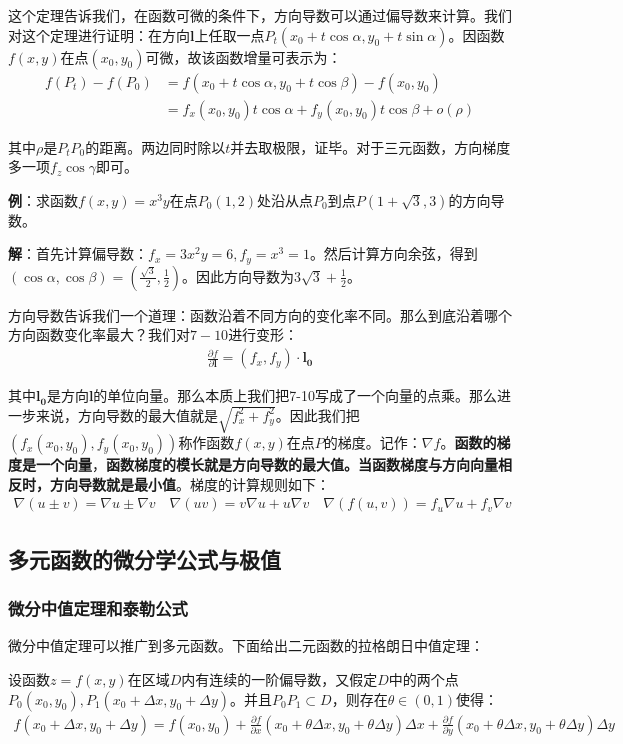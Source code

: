 \documentclass{ctexart}
\let\oldtextbf\textbf %
\renewcommand{\textbf}[1]{\textcolor{btex}{\oldtextbf{#1}}} %
\begin{document}
这个定理告诉我们，在函数可微的条件下，方向导数可以通过偏导数来计算。我们对这个定理进行证明：在方向$\bm{l}$上任取一点$P_t(x_0+t\cos\alpha,y_0+t\sin\alpha)$。因函数$f(x,y)$在点$(x_0,y_0)$可微，故该函数增量可表示为：
\begin{align*}
    f(P_t)-f(P_0)&=f(x_0+t\cos\alpha,y_0+t\cos\beta)-f(x_0,y_0)\\
    &=f_x(x_0,y_0)t\cos\alpha+f_y(x_0,y_0)t\cos\beta+o(\rho)
\end{align*}

其中$\rho$是$P_tP_0$的距离。两边同时除以$t$并去取极限，证毕。对于三元函数，方向梯度多一项$f_z\cos\gamma$即可。

\textbf{例}：求函数$f(x,y)=x^3y$在点$P_0(1,2)$处沿从点$P_0$到点$P(1+\sqrt{3},3)$的方向导数。

\textbf{解}：首先计算偏导数：$f_x=3x^2y=6,f_y=x^3=1$。然后计算方向余弦，得到$(\cos\alpha,\cos\beta)=(\frac{\sqrt{3}}{2},\frac{1}{2})$。因此方向导数为$3\sqrt{3}+\frac{1}{2}$。

方向导数告诉我们一个道理：函数沿着不同方向的变化率不同。那么到底沿着哪个方向函数变化率最大？我们对$7-10$进行变形：
\begin{align*}
    \frac{\partial f}{\partial \bm{l}}=(f_x,f_y)\cdot \bm{l_0}
\end{align*}

其中$\bm{l_0}$是方向$\bm{l}$的单位向量。那么本质上我们把7-10写成了一个向量的点乘。那么进一步来说，方向导数的最大值就是$\sqrt{f_x^2+f_y^2}$。因此我们把$(f_x(x_0,y_0),f_y(x_0,y_0))$称作函数$f(x,y)$在点$P$的梯度。记作：$\nabla f$。\textbf{函数的梯度是一个向量}，\textbf{函数梯度的模长就是方向导数的最大值。当函数梯度与方向向量相反时，方向导数就是最小值}。梯度的计算规则如下：
\begin{align*}
    \nabla(u\pm v)=\nabla u\pm \nabla v \quad \nabla(uv)=v\nabla u+u\nabla v\quad \nabla(f(u,v))=f_u\nabla u+f_v\nabla v
\end{align*}

\subsection{多元函数的微分学公式与极值}
\subsubsection{微分中值定理和泰勒公式}
微分中值定理可以推广到多元函数。下面给出二元函数的拉格朗日中值定理：
\begin{tcolorbox}[
    colback=bac1,     %
    colframe=fra1,   %
    coltitle=white,             %
    coltext=tex1,
    title=二元函数拉格朗日中值定理,
    fonttitle=\bfseries,        %
arc=3mm,                     %
breakable
]
设函数$z=f(x,y)$在区域$D$内有连续的一阶偏导数，又假定$D$中的两个点$P_0(x_0,y_0),P_1(x_0+\Delta x,y_0+\Delta y)$。并且$P_0P_1\subset D$，则存在$\theta\in(0,1)$使得：
\begin{align*}
    f(x_0+\Delta x,y_0+\Delta y)=f(x_0,y_0)+\frac{\partial f}{\partial x}(x_0+\theta \Delta x,y_0+\theta \Delta y)\Delta x+\frac{\partial f}{\partial y}(x_0+\theta\Delta x,y_0+\theta\Delta y)\Delta y\tag{7-11}
\end{align*}
\end{tcolorbox}
\end{document}
